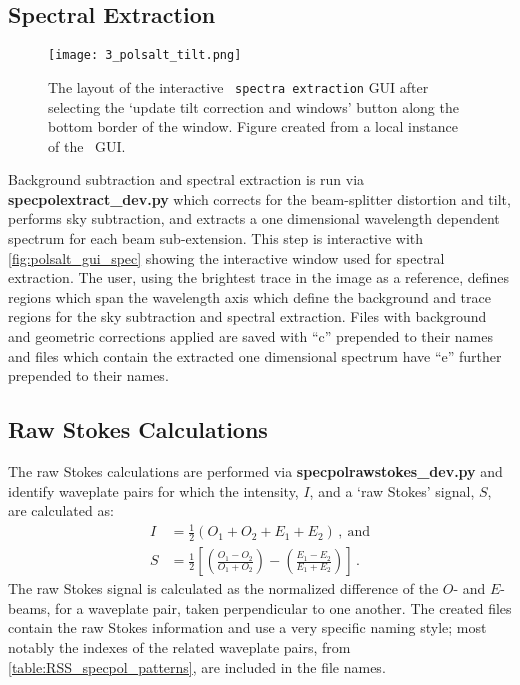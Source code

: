 \subsection{Spectral Extraction} \label{subsec:pol_spec}

\begin{figure}[t]
    \centering
    \texttt{[image: 3\_polsalt\_tilt.png]}
    \caption{The layout of the interactive \polsalt\ \texttt{spectra extraction} \gls{GUI} after selecting the `update tilt correction and windows' button along the bottom border of the window. Figure created from a local instance of the \polsalt\ \gls{GUI}.}
    \label{fig:polsalt_gui_spec}
\end{figure}

Background subtraction and spectral extraction is run via \textbf{spec\-pol\-extract\_dev.py} which corrects for the beam-splitter distortion and tilt, performs sky subtraction, and extracts a one dimensional wavelength dependent spectrum for each beam sub-extension. This step is interactive with \autoref{fig:polsalt_gui_spec} showing the interactive window used for spectral extraction.
The user, using the brightest trace in the image as a reference, defines regions which span the wavelength axis which define the background and trace regions for the sky subtraction and spectral extraction. Files with background and geometric corrections applied are saved with ``c'' prepended to their names and files which contain the extracted one dimensional spectrum have ``e'' further prepended to their names.

\subsection{Raw Stokes Calculations} \label{subsec:pol_rstokes}

The raw Stokes calculations are performed via \textbf{specpolraw\-stokes\_dev.py} and identify waveplate pairs for which the intensity, $I$, and a `raw Stokes' signal, $S$, are calculated as:
\begin{align} \label{eq:polsalt_rawstokes}
    I &= \frac{1}{2} (O_{1} + O_{2} + E_{1} + E_{2})\,,\ \text{and}\\
    S &= \frac{1}{2} \left[ \left( \frac{O_{1} - O_{2}}{O_{1} + O_{2}} \right) - \left( \frac{E_{1} - E_{2}}{E_{1} + E_{2}} \right) \right]\,.
\end{align}
The raw Stokes signal is calculated as the normalized difference of the $O$- and $E$-beams, for a waveplate pair, taken perpendicular to one another. The created files contain the raw Stokes information and use a very specific naming style; most notably the indexes of the related waveplate pairs, from \autoref{table:RSS_specpol_patterns}, are included in the file names.

